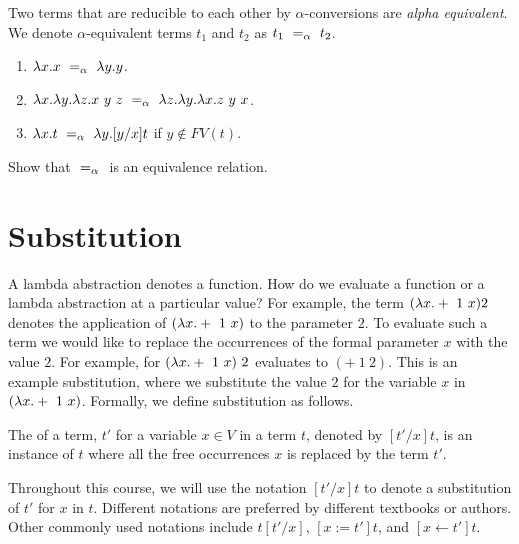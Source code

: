 \begin{definition}
Two terms that are reducible to each other by $\alpha$-conversions are
\emph{alpha equivalent}. We denote $\alpha$-equivalent terms $t_1$ and
$t_2$ as $t_1 ~=_{\alpha}~ t_2$.
\end{definition}

\begin{example}
\begin{enumerate}
\item $\lambda x.x ~=_{\alpha}~ \lambda y.y$. 
\item $\lambda x. \lambda y. \lambda z. x ~y~z ~=_{\alpha}~ \lambda z. \lambda y. \lambda x. z~y~x$.
\item $\lambda x.t ~=_{\alpha}~ \lambda y.[y/x]t$ if  $y \not\in FV(t)$.
\end{enumerate}
\end{example}

\begin{exercise}
Show that $~=_{\alpha}~$ is an equivalence relation.
\end{exercise}


\section{Substitution}
\label{sec:lambda::sub}

A lambda abstraction denotes a function.  How do we evaluate a
function or a lambda abstraction at a particular value?  For example,
the term $(\lambda x.+~1~x)2$ denotes the application of $(\lambda x.+~1~x)$ to
the parameter $2$.  To evaluate such a term we would like to replace
the occurrences of the formal parameter $x$ with the value $2$.  For
example, for $(\lambda x.+~1~x)~2$ evaluates to $(+~1~2)$.  This is an
example substitution, where we substitute the value $2$ for the
variable $x$ in $(\lambda x.+~1~x)$.  Formally, we define substitution as
follows.

\begin{definition}[Substitution]
\label{def:lambda::sub::basic}
The  of a term, $t'$ for a variable $x \in V$ in a term
$t$, denoted by $[t'/x]t$, is an instance of $t$ where all the free
occurrences $x$ is replaced by the term $t'$.
\end{definition}

Throughout this course, we will use the notation $[t'/x]t$ to denote a
substitution of $t'$ for $x$ in $t$.  Different notations are
preferred by different textbooks or authors. Other commonly used
notations include $t[t'/x]$, $[x:=t']t$, and  $[x \leftarrow t']t$.  


